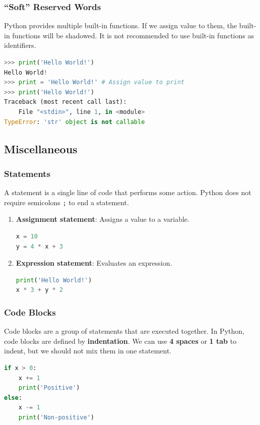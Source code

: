 \documentclass[beamer, en, version=2.0]{huangfusl-template}
\begin{document}
    \begin{frame}[fragile]
        \frametitle{``Soft'' Reserved Words}

        Python provides multiple built-in functions. If we assign value to them, the built-in functions will be shadowed. It is not recommended to use built-in functions as identifiers.

\begin{lstlisting}[language=python]
>>> print('Hello World!')
Hello World!
>>> print = 'Hello World!' # Assign value to print
>>> print('Hello World!')
Traceback (most recent call last):
    File "<stdin>", line 1, in <module>
TypeError: 'str' object is not callable
\end{lstlisting}
    \end{frame}
    \subsection{Miscellaneous}
    \begin{frame}[fragile]
        \frametitle{Statements}

        A statement is a single line of code that performs some action. Python does not require semicolons {\footnotesize\verb|;|} to end a statement.

        \begin{enumerate}
            \item \textbf{Assignment statement}: Assigns a value to a variable.
\begin{lstlisting}[language=python]
x = 10
y = 4 * x + 3
\end{lstlisting}
            \item \textbf{Expression statement}: Evaluates an expression.
\begin{lstlisting}[language=python]
print('Hello World!')
x * 3 + y * 2
\end{lstlisting}
        \end{enumerate}
    \end{frame}
    \begin{frame}[fragile]
        \frametitle{Code Blocks}

        Code blocks are a group of statements that are executed together. In Python, code blocks are defined by \textbf{indentation}. We can use \textbf{4 spaces} or \textbf{1 tab} to indent, but we should not mix them in one statement.

\begin{lstlisting}[language=python, showspaces=true, showstringspaces=true]
if x > 0:
    x += 1
    print('Positive')
else:
    x -= 1
    print('Non-positive')
\end{lstlisting}
    \end{frame}
\end{document}
